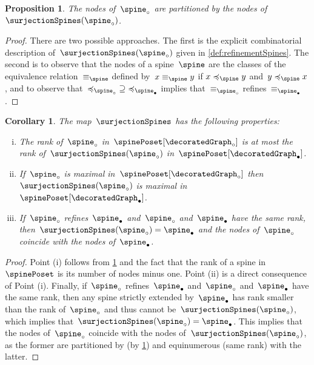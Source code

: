 \documentclass{amsart}
\newtheorem{corollary}[theorem]{Corollary}
\newtheorem{proposition}[theorem]{Proposition}
\theoremstyle{definition}
\begin{document}
\begin{proposition}
  \label{prop:filteredRefinementSpines}
  The nodes of~$\spine_\circ$ are partitioned by the nodes of~$\surjectionSpines(\spine_\circ)$.
\end{proposition}

\begin{proof}
  There are two possible approaches.
  The first is the explicit combinatorial description of~$\surjectionSpines(\spine_\circ)$ given in \cref{def:refinementSpines}.
  The second is to observe that the nodes of a spine~$\spine$ are the classes of the equivalence relation~$\equiv_{\spine}$ defined by~$x \equiv_{\spine} y$ if $x \preccurlyeq_{\spine} y$ and~$y \preccurlyeq_{\spine} x$, and to observe that~${\preccurlyeq_{\spine_\circ}} \supseteq {\preccurlyeq_{\spine_\bullet}}$ implies that~$\equiv_{\spine_\circ}$ refines~$\equiv_{\spine_\bullet}$.
\end{proof}

\begin{corollary}
  \label{coro:filteredRefinementSpines}
  The map~$\surjectionSpines$ has the following properties:
  \begin{enumerate}[(i)]
  \item The rank of~$\spine_\circ$ in~$\spinePoset[\decoratedGraph_\circ]$ is at most the rank of~$\surjectionSpines(\spine_\circ)$ in~$\spinePoset[\decoratedGraph_\bullet]$.
  \item If~$\spine_\circ$ is maximal in~$\spinePoset[\decoratedGraph_\circ]$ then~$\surjectionSpines(\spine_\circ)$ is maximal in~$\spinePoset[\decoratedGraph_\bullet]$.
  \item If~$\spine_\circ$ refines~$\spine_\bullet$ and~$\spine_\circ$ and~$\spine_\bullet$ have the same rank, then~$\surjectionSpines(\spine_\circ) = \spine_\bullet$ and the nodes of~$\spine_\circ$ coincide with the nodes of~$\spine_\bullet$.
  \end{enumerate}
\end{corollary}

\begin{proof}
  Point (i) follows from \cref{prop:filteredRefinementSpines} and the fact that the rank of a spine in~$\spinePoset$ is its number of nodes minus one.
  Point (ii) is a direct consequence of Point (i).
  Finally, if~$\spine_\circ$ refines~$\spine_\bullet$ and~$\spine_\circ$ and~$\spine_\bullet$ have the same rank, then any spine strictly extended by~$\spine_\bullet$ has rank smaller than the rank of~$\spine_\circ$ and thus cannot be~$\surjectionSpines(\spine_\circ)$, which implies that~$\surjectionSpines(\spine_\circ) = \spine_\bullet$.
  This implies that the nodes of~$\spine_\circ$ coincide with the nodes of~$\surjectionSpines(\spine_\circ)$, as the former are partitioned by (by \cref{prop:filteredRefinementSpines}) and equinumerous (same rank) with the latter.
\end{proof}
\end{document}
